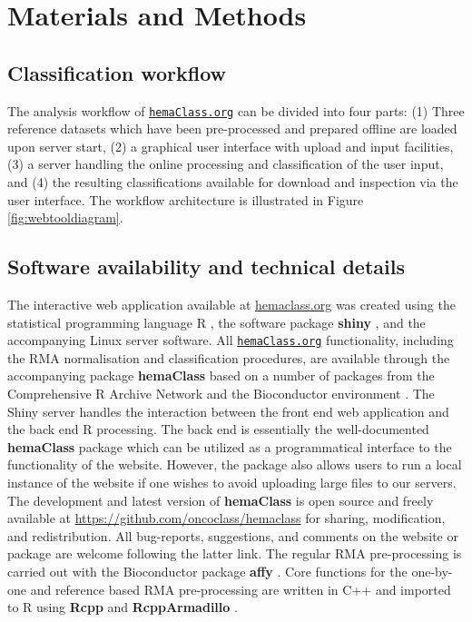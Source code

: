\documentclass{bmcart}
\newcommand{\hemaClass}{\href{http://hemaClass.org}{\texttt{hemaClass.org}}}
\newcommand{\R}{\textsf{R}}
\newcommand{\pkg}[1]{\textbf{#1}}
\begin{document}
\section{Materials and Methods}



\subsection{Classification workflow}
The analysis workflow of \hemaClass{} can be divided into four parts:
(1) Three reference datasets which have been pre-processed and prepared offline are loaded upon server start,
(2) a graphical user interface with upload and input facilities,
(3) a server handling the online processing and classification of the user input, and
(4) the resulting classifications available for download and inspection via the user interface.
The workflow architecture is illustrated in Figure \ref{fig:webtooldiagram}.



\subsection{Software availability and technical details}
The interactive web application available at \url{hemaclass.org} was created using the statistical programming language \R{} \citep{RCoreTeam}, the software package \pkg{shiny} \citep{shiny}, and the accompanying Linux server software.
All \hemaClass{} functionality, including the RMA normalisation and classification procedures, are available through the accompanying package \pkg{hemaClass} based on a number of packages from the Comprehensive R Archive Network \citep{RCoreTeam} and the Bioconductor environment \citep{Gentleman2004}.
The Shiny server handles the interaction between the front end web application and the back end \R{} processing.
The back end is essentially the well-documented \pkg{hemaClass} package which can be utilized as a programmatical interface to the functionality of the website.
However, the package also allows users to run a local instance of the website if one wishes to avoid uploading large files to our servers.
The development and latest version of \pkg{hemaClass} is open source and freely available at \url{https://github.com/oncoclass/hemaclass} for sharing, modification, and redistribution.
All bug-reports, suggestions, and comments on the website or package are welcome following the latter link.
The regular RMA pre-processing is carried out with the Bioconductor package \pkg{affy} \citep{Gautier2004}.
Core functions for the one-by-one and reference based RMA pre-processing are written in \textsf{C++} and imported to \R{} using \pkg{Rcpp} and \pkg{RcppArmadillo} \citep{Rcpp2013,Eddelbuettel2011,RcppArmadillo,Sanderson2010}.
\end{document}
